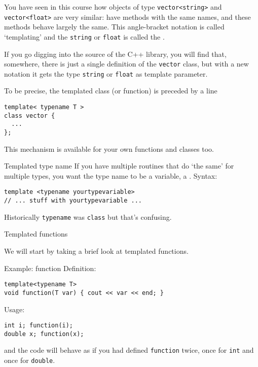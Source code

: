 
You have seen in this course how
objects of type \lstinline+vector<string>+ and \lstinline+vector<float>+
are very similar:
have methods with the same names,
and these methods behave largely the same.
This angle-bracket notation is called `templating' and the
\lstinline+string+ or \lstinline+float+ is called the
.

If you go digging into the source of the C++ library,
you will find that, somewhere,
there is just a single definition of the \lstinline+vector+ class,
but with a new notation it gets the type \lstinline+string+ or \lstinline+float+
as template parameter.

To be precise, the templated class (or function)
is preceded by a line
\begin{lstlisting}
template< typename T >
class vector {
  ...
};
\end{lstlisting}

This mechanism is available for your own functions and classes too.

\begin{block}{Templated type name}
  \label{sl:template-gen}
  If you have multiple routines that do `the same' for multiple types,
  you want the type name to be a variable,
  a .
  Syntax:
\begin{lstlisting}
template <typename yourtypevariable>
// ... stuff with yourtypevariable ...
\end{lstlisting}
\end{block}

Historically \lstinline{typename} was \lstinline{class} but that's confusing.

 {Templated functions}

We will start by taking a brief look at
templated functions.

\begin{block}{Example: function}
  \label{sl:template-fun}
  Definition:
\begin{lstlisting}
template<typename T>
void function(T var) { cout << var << end; }
\end{lstlisting}
Usage:
\begin{lstlisting}
int i; function(i);
double x; function(x);
\end{lstlisting}
and the code will behave as if you had defined \lstinline{function} twice,
once for \lstinline{int} and once for \lstinline{double}.
\end{block}


